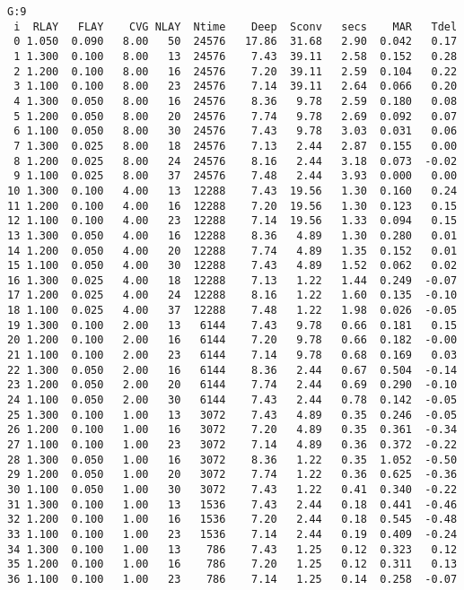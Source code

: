 \documentclass{article}
\begin{document}
\begin{table} \caption[KRC run G]{KRC run G. See Table \ref{runH} caption}  \label{runG}
\begin{verbatim}
G:9
 i  RLAY   FLAY    CVG NLAY  Ntime    Deep  Sconv   secs    MAR   Tdel
 0 1.050  0.090   8.00   50  24576   17.86  31.68   2.90  0.042   0.17
 1 1.300  0.100   8.00   13  24576    7.43  39.11   2.58  0.152   0.28
 2 1.200  0.100   8.00   16  24576    7.20  39.11   2.59  0.104   0.22
 3 1.100  0.100   8.00   23  24576    7.14  39.11   2.64  0.066   0.20
 4 1.300  0.050   8.00   16  24576    8.36   9.78   2.59  0.180   0.08
 5 1.200  0.050   8.00   20  24576    7.74   9.78   2.69  0.092   0.07
 6 1.100  0.050   8.00   30  24576    7.43   9.78   3.03  0.031   0.06
 7 1.300  0.025   8.00   18  24576    7.13   2.44   2.87  0.155   0.00
 8 1.200  0.025   8.00   24  24576    8.16   2.44   3.18  0.073  -0.02
 9 1.100  0.025   8.00   37  24576    7.48   2.44   3.93  0.000   0.00
10 1.300  0.100   4.00   13  12288    7.43  19.56   1.30  0.160   0.24
11 1.200  0.100   4.00   16  12288    7.20  19.56   1.30  0.123   0.15
12 1.100  0.100   4.00   23  12288    7.14  19.56   1.33  0.094   0.15
13 1.300  0.050   4.00   16  12288    8.36   4.89   1.30  0.280   0.01
14 1.200  0.050   4.00   20  12288    7.74   4.89   1.35  0.152   0.01
15 1.100  0.050   4.00   30  12288    7.43   4.89   1.52  0.062   0.02
16 1.300  0.025   4.00   18  12288    7.13   1.22   1.44  0.249  -0.07
17 1.200  0.025   4.00   24  12288    8.16   1.22   1.60  0.135  -0.10
18 1.100  0.025   4.00   37  12288    7.48   1.22   1.98  0.026  -0.05
19 1.300  0.100   2.00   13   6144    7.43   9.78   0.66  0.181   0.15
20 1.200  0.100   2.00   16   6144    7.20   9.78   0.66  0.182  -0.00
21 1.100  0.100   2.00   23   6144    7.14   9.78   0.68  0.169   0.03
22 1.300  0.050   2.00   16   6144    8.36   2.44   0.67  0.504  -0.14
23 1.200  0.050   2.00   20   6144    7.74   2.44   0.69  0.290  -0.10
24 1.100  0.050   2.00   30   6144    7.43   2.44   0.78  0.142  -0.05
25 1.300  0.100   1.00   13   3072    7.43   4.89   0.35  0.246  -0.05
26 1.200  0.100   1.00   16   3072    7.20   4.89   0.35  0.361  -0.34
27 1.100  0.100   1.00   23   3072    7.14   4.89   0.36  0.372  -0.22
28 1.300  0.050   1.00   16   3072    8.36   1.22   0.35  1.052  -0.50
29 1.200  0.050   1.00   20   3072    7.74   1.22   0.36  0.625  -0.36
30 1.100  0.050   1.00   30   3072    7.43   1.22   0.41  0.340  -0.22
31 1.300  0.100   1.00   13   1536    7.43   2.44   0.18  0.441  -0.46
32 1.200  0.100   1.00   16   1536    7.20   2.44   0.18  0.545  -0.48
33 1.100  0.100   1.00   23   1536    7.14   2.44   0.19  0.409  -0.24
34 1.300  0.100   1.00   13    786    7.43   1.25   0.12  0.323   0.12
35 1.200  0.100   1.00   16    786    7.20   1.25   0.12  0.311   0.13
36 1.100  0.100   1.00   23    786    7.14   1.25   0.14  0.258  -0.07
\end{verbatim}
\vspace{-3.0mm}
\hrulefill \end{table}  
\end{document}

